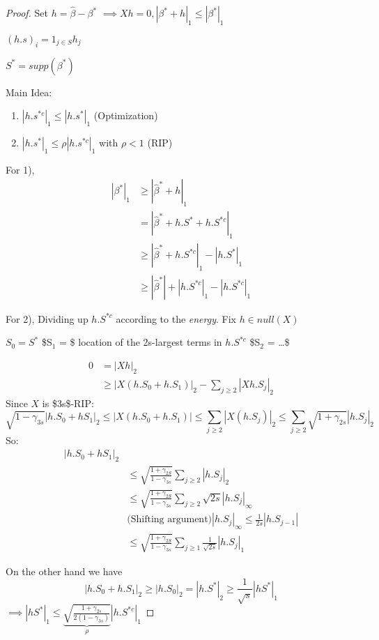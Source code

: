 \documentclass[11pt]{article}
\begin{document}
\begin{proof}
Set \(h = \hat \beta - \beta^*\) \(\implies Xh = 0, |\beta^* + h|_1 \le |\beta^*|_1\) 

\((h.s)_i = 1_{j \in S} h_j\)

\(S^* = supp(\beta^*)\)

Main Idea:
\begin{enumerate}
\item \(|h.s^{* c}|_1 \le |h.s^*|_1\) (Optimization)
\item \(|h.s^*|_1 \le \rho |h.s^{* c}|_1\) with \(\rho < 1\) (RIP)
\end{enumerate}

For 1),
\begin{align*}
|\beta^*|_1 &\ge |\hat \beta^* + h|_1
\\&= |\hat \beta^* + h.S^* + h.S^{* c}|_1
\\&\ge |\hat \beta^* + h.S^{* c}|_1 - |h.S^*|_1
\\&\ge |\hat \beta^*| + |h.S^{* c}|_1 - |h.S^{* c}|_1
\end{align*}

For 2),
Dividing up \(h.S^{* c}\) according to the \emph{energy}.
Fix \(h \in null(X)\)

\(S_0 = S^*\)
\$S\(_{\text{1}}\) = \$ location of the 2s-largest terms in \(h.S^{* c}\)
\$S\(_{\text{2}}\) = \ldots{}\$

\begin{align*}
0 &= |Xh|_2
\\&\ge |X(h.S_0 + h.S_1)|_2 - \sum_{j \ge 2} |Xh.S_j|_2
\end{align*}
Since \(X\) is \$3s\$-RIP:
$$\sqrt{1 - \gamma_{3s}} |h.S_0 + hS_1|_2 \le |X(h.S_0 + h.S_1)| \le \sum_{j \ge 2} |X(h.S_j)|_2 \le \sum_{j \ge 2} \sqrt{1 + \gamma_{2s}} |h.S_j|_2$$
So:
\begin{align*}
|h.S_0 + hS_1|_2 \\ &\le \sqrt{\frac{1 + \gamma_{2S}}{1 - \gamma_{3s}}} \sum_{j \ge 2} |h.S_j|_2
\\&\le \sqrt{\frac{1 + \gamma_{2S}}{1 - \gamma_{3s}}} \sum_{j \ge 2} \sqrt{2s} |h.S_j|_{\infty}
\\&\text{(Shifting argument)} |h.S_j|_{\infty} \le \frac{1}{2s} |h.S_{j-1}|
\\&\le \sqrt{\frac{1 + \gamma_{2S}}{1 - \gamma_{3s}}} \sum_{j \ge 1} \frac1{\sqrt{2s}} |h.S_j|_1
\end{align*}

On the other hand we have
$$|h.S_0 + h.S_1|_2 \ge |h.S_0|_2 = |h.S^*|_2 \ge \frac{1}{\sqrt s} |hS^*|_1$$
\(\implies |hS^*|_1 \le \underbrace{\sqrt{\frac{ 1+ \gamma_{2s}}{2(1 - \gamma_{3s})}}}_{\rho} |h.S^{* c}|_1\) 
\end{proof}
\end{document}
